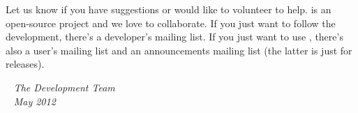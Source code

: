 Let us know if you have suggestions or would like to volunteer to
help.  \Stan is an open-source project and we love to collaborate.  If
you just want to follow the development, there's a developer's mailing
list.  If you just want to use \Stan, there's also a user's mailing
list and an announcements mailing list (the latter is just for releases).

\vspace*{12pt}
\mbox{ } \hfill {\it The \Stan Development Team}
\\
\mbox{ } \hfill {\it May 2012}
